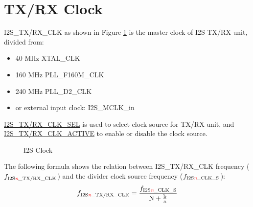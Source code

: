 \documentclass[main\_\_CN.tex]{subfiles}
\begin{document}
\section{TX/RX Clock}\label{The Clock of I2S Module}

I2S\_TX/RX\_CLK as shown in Figure \ref{Figure:i2s_clk} is the master clock of I2S TX/RX unit, divided from:
\begin{itemize}
    \item 40 MHz XTAL\_CLK
    \item 160 MHz PLL\_F160M\_CLK
    \item 240 MHz PLL\_D2\_CLK
    \item or external input clock: I2S\_MCLK\_in
\end{itemize}

\hyperref[fielddesc:I2SRXCLKSEL]{I2S\_TX/RX\_CLK\_SEL} is used to select clock source for TX/RX unit, and \hyperref[fielddesc:I2SRXCLKACTIVE]{I2S\_TX/RX\_CLK\_ACTIVE} to enable or disable the clock source.

\begin{figure}[H]
    \centering
    \caption{I2S Clock}
    \label{Figure:i2s_clk}
\end{figure}


The following formula shows the relation between I2S\_TX/RX\_CLK frequency ($f_{\textrm{I2S\textcolor{red}{\it{n}}\_TX/RX\_CLK}}$) and the divider clock source frequency ($f_{\textrm{I2S\textcolor{red}{\it{n}}\_CLK\_S}}$):
$$f_{\textrm{I2S\textcolor{red}{\it{n}}\_TX/RX\_CLK}}=\frac{f_{\textrm{I2S\textcolor{red}{\it{n}}\_CLK\_S}}}{\textrm{N} + \frac{\textrm{b}}{\textrm{a}}}$$
\end{document}
